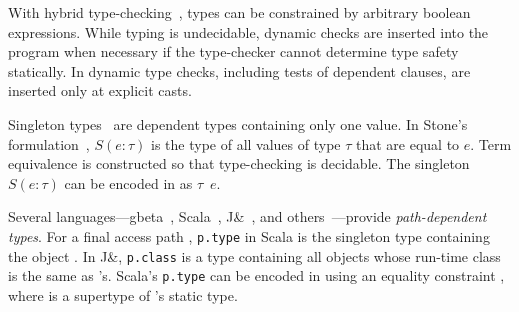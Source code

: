


With hybrid type-checking~\cite{flanagan-popl06,flanagan-fool06},
types can be constrained by arbitrary boolean expressions.
While typing is undecidable, dynamic checks are inserted into
the program when necessary if the type-checker cannot determine
type safety statically.
In \Xten{} dynamic type checks, including tests of dependent
clauses, are inserted only at explicit casts.


Singleton types~\cite{aspinall-singletons,stone00} are dependent
types containing only one value.  
In Stone's formulation~\cite{stone00},
$S(e : \tau)$
is the type of all values of type $\tau$ that are equal to $e$.
Term equivalence is
constructed so that type-checking is decidable.
The singleton $S(e: \tau)$ can be encoded in \Xten{} as
$\tau$~$e$\xcd{)}.



Several languages---gbeta~\cite{ernst99-gbeta},
Scala~\cite{scala-overview,scala-oopsla05}, J\&~\cite{nqm06}, and
others~\cite{oz01,ocrz-ecoop03,dependent-classes}---provide {\em path-dependent
types}.  For a final access path , {\tt p.type}
in Scala is the singleton type containing the object .
In J\&, {\tt p.class} is a type containing all objects
whose run-time class is the same as 's.
Scala's {\tt p.type} can be encoded in \Xten{} using an equality
constraint , where  is a supertype of
's static type.


